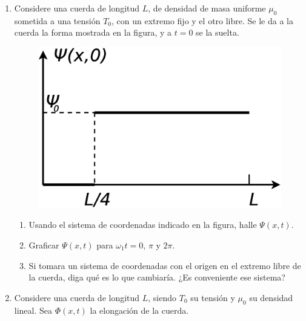 \documentclass[11pt,spanish,a4paper]{article}
\begin{document}
\begin{enumerate}
\item Considere una cuerda de longitud $L$, de densidad de masa uniforme
$\mu_{0}$ sometida a una tensión $T_{0}$, con un extremo fijo y
el otro libre. Se le da a la cuerda la forma mostrada en la figura,
y a $t=0$ se la suelta.
\begin{figure}[H]
\centering{}\includegraphics[clip,scale=0.25]{ej1-25}
\end{figure}

 


\begin{enumerate}
\item Usando el sistema de coordenadas indicado en la figura, halle $\Psi(x,t)$.
\item Graficar $\Psi(x,t)$ para $\omega_{1}t=0,\,\pi$ y $2\pi$.
\item Si tomara un sistema de coordenadas con el origen en el extremo libre
de la cuerda, diga qué es lo que cambiaría. ¿Es conveniente ese sistema?
\end{enumerate}


\item Considere una cuerda de longitud $L$, siendo $T_{0}$ su tensión
y $\mu_{0}$ su densidad lineal. Sea $\Phi(x,t)$ la elongación de
la cuerda.


\end{enumerate}
\end{document}
